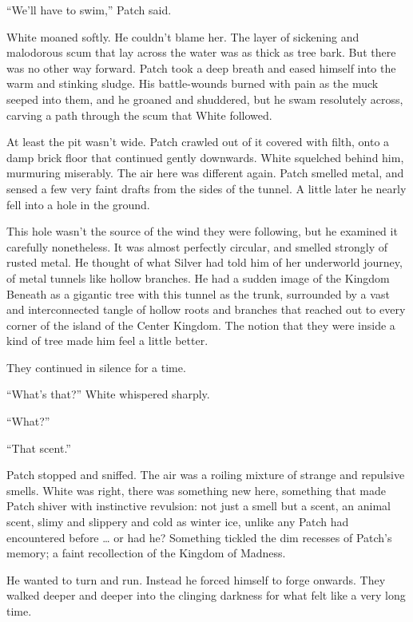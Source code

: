 \documentclass[ebook,oneside,openany,17pt]{memoir}
\newenvironment{tolerant}[1]{%
  \par\tolerance=#1\relax
}{%
  \par
}
\begin{document}
“We’ll have to swim,” Patch said.

\begin{tolerant}{2000}
White moaned softly. He couldn’t blame her. The layer of sickening and
malodorous scum that lay across the water was as thick as tree
bark. But there was no other way forward. Patch took a deep breath and
eased himself into the warm and stinking sludge. His battle-wounds
burned with pain as the muck seeped into them, and he groaned and
shuddered, but he swam resolutely across, carving a path through the
scum that White followed.
\end{tolerant}

At least the pit wasn’t wide. Patch crawled out of it covered with
filth, onto a damp brick floor that continued gently downwards. White
squelched behind him, murmuring miserably. The air here was different
again. Patch smelled metal, and sensed a few very faint drafts from
the sides of the tunnel. A little later he nearly fell into a hole in
the ground.

This hole wasn’t the source of the wind they were following, but he
examined it carefully nonetheless. It was almost perfectly circular,
and smelled strongly of rusted metal. He thought of what Silver had
told him of her underworld journey, of metal tunnels like hollow
branches. He had a sudden image of the Kingdom Beneath as a gigantic
tree with this tunnel as the trunk, surrounded by a vast and
interconnected tangle of hollow roots and branches that reached out to
every corner of the island of the Center Kingdom. The notion that they
were inside a kind of tree made him feel a little better.

They continued in silence for a time.

“What’s that?” White whispered sharply.

“What?”

“That scent.”

\begin{tolerant}{500}
Patch stopped and sniffed. The air was a roiling mixture of strange
and repulsive smells. White was right, there was something new here,
something that made Patch shiver with instinctive revulsion: not just
a smell but a scent, an animal scent, slimy and slippery and cold as
winter ice, unlike any Patch had encountered before … or had he?
Something tickled the dim recesses of Patch’s memory; a faint
recollection of the Kingdom of Madness.
\end{tolerant}

He wanted to turn and run. Instead he forced himself to forge
onwards. They walked deeper and deeper into the clinging darkness for
what felt like a very long time.
\end{document}
